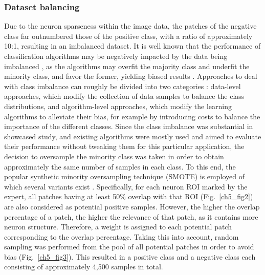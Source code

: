 \subsubsection{Dataset balancing}
\label{sec:balanced}
Due to the neuron sparseness within the image data, the patches of the negative class far outnumbered those of the positive class, with a ratio of approximately 10:1, resulting in an imbalanced dataset. It is well known that the performance of classification algorithms may be negatively impacted by the data being imbalanced \cite{chawla2004editorial, daskalaki2006evaluation, forman2010apples, branco2016survey}, as the algorithms may overfit the majority class and underfit the minority class, and favor the former, yielding biased results \cite{garcia2014bias, li2018adaptive}. Approaches to deal with class imbalance can roughly be divided into two categories \cite{he2008learning, krawczyk2016learning, haixiang2017learning}: data-level approaches, which modify the collection of data samples to balance the class distributions, and algorithm-level approaches, which modify the learning algorithms to alleviate their bias, for example by introducing costs to balance the importance of the different classes. Since the class imbalance was substantial in showcased study, and existing algorithms were mostly used and aimed to evaluate their performance without tweaking them for this particular application, the decision to oversample the minority class was taken in order to obtain approximately the same number of samples in each class. To this end, the popular synthetic minority oversampling technique (SMOTE) is employed \cite{chawla2002smote} of which several variants exist \cite{saez2015smote, krawczyk2016learning, gosain2017handling}. Specifically, for each neuron ROI marked by the expert, all patches having at least 50\% overlap with that ROI (Fig.~\ref{ch5_fig2}) are also considered as potential positive samples. However, the higher the overlap percentage of a patch, the higher the relevance of that patch, as it contains more neuron structure. Therefore, a weight is assigned to each potential patch corresponding to the overlap percentage. Taking this into account, random sampling was performed from the pool of all potential patches in order to avoid bias (Fig.~\ref{ch5_fig3}). This resulted in a positive class and a negative class each consisting of approximately 4,500 samples in total.
